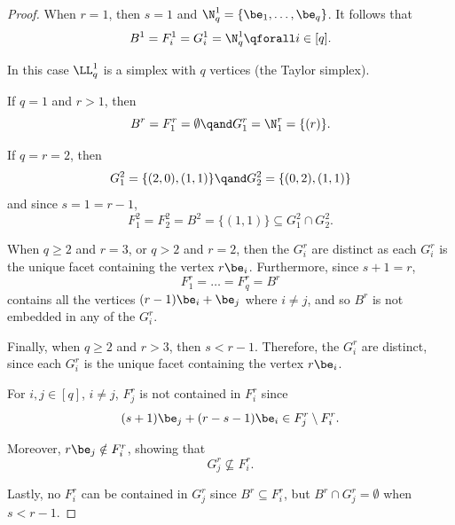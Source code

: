 \begin{proof}

When $r=1$, then $s = 1$ and $\N^1_q = \{\be_1, \ldots, \be_q\}$.
It follows that $$B^1 = F^1_i=G^1_i=\N^1_q \qforall i\in [q].$$

In this case $\LL^1_q$ is a simplex with $q$ vertices \textup{(}the
Taylor simplex\textup{)}.

If $q=1$ and $r>1$, then $$B^r=F^r_1=\emptyset \qand
G^r_1=\N^r_1 = \{(r)\}.$$

If $q = r = 2$, then
$$G^2_1 = \{(2,0),(1,1)\} \qand G^2_2 = \{(0,2),(1,1)\}$$ and since
$s=1=r-1$,
$$F^2_1=F^2_2=B^2=\{(1,1)\} \subseteq G^2_1\cap G^2_2.$$

When $q\ge2$ and $r=3$, or $q >2$ and $r = 2$, then the $G_i^r$
are distinct as each $G_i^r$ is the unique facet containing the vertex
$r\be_i$.  Furthermore, since $s+1=r$,
$$F^r_1=\dots=F^r_q=B^r$$ contains all the vertices $(r-1)\be_i+\be_j$
where $i\neq j$, and so $B^r$ is not embedded in any of the $G_i^r$.

Finally, when $q\ge2$ and $r>3$, then $s <
                r-1$. Therefore, the $G_i^r$ are distinct, since each
                $G_i^r$ is the unique facet containing the vertex
                $r\be_i$.

For $i, j \in [q]$, $i\neq j$, $F^r_j$ is not
                contained in $F^r_i$ since
$$(s+1) \be_j + (r - s-1) \be_i \in F^r_j \setminus F^r_i.$$

Moreover, $r \be_j \notin F^r_i$, showing that $$G^r_j \nsubseteq F^r_i.$$

Lastly, no $F^r_i$ can be contained in $G^r_j$ since $B^r \subseteq F^r_i$,
but $B^r \cap G^r_j = \emptyset$ when $s < r-1$.
\end{proof}

